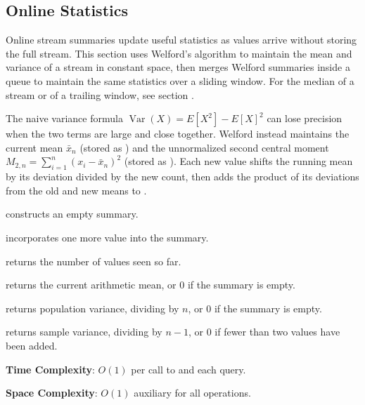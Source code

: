 \subsection{Online Statistics}
\label{sec:1.6.4}
Online stream summaries update useful statistics as values arrive without storing the full stream. This section uses Welford's algorithm to maintain the mean and variance of a stream in constant space, then merges Welford summaries inside a queue to maintain the same statistics over a sliding window. For the median of a stream or of a trailing window, see section .

The naive variance formula $\operatorname{Var}(X) = E[X^2] - E[X]^2$ can lose precision when the two terms are large and close together. Welford instead maintains the current mean $\bar{x}_n$ (stored as ) and the unnormalized second central moment $M_{2,n} = \sum_{i=1}^{n}(x_i - \bar{x}_n)^2$ (stored as ). Each new value shifts the running mean by its deviation divided by the new count, then adds the product of its deviations from the old and new means to .

\begin{compactitem}
  \item {} constructs an empty summary.
  \item {} incorporates one more value  into the summary.
  \item {} returns the number of values seen so far.
  \item {} returns the current arithmetic mean, or $0$ if the summary is empty.
  \item {} returns population variance, dividing by $n$, or $0$ if the summary is empty.
  \item {} returns sample variance, dividing by $n - 1$, or $0$ if fewer than two values have been added.
\end{compactitem}

\textbf{Time Complexity}: $O(1)$ per call to  and each query.

\textbf{Space Complexity}: $O(1)$ auxiliary for all operations.

